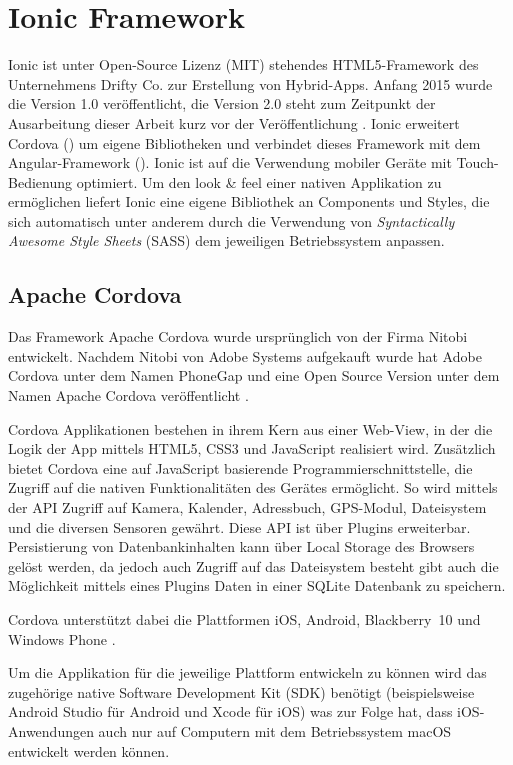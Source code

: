 \chapter{Ionic Framework}
\label{cha:ionic}
%
Ionic ist unter Open-Source Lizenz (MIT) stehendes HTML5-Framework des Unternehmens Drifty Co. zur Erstellung von Hybrid-Apps. Anfang 2015 wurde die Version 1.0 veröffentlicht, die Version 2.0 steht zum Zeitpunkt der Ausarbeitung dieser Arbeit kurz vor der Veröffentlichung \cite{ionic2Anounce}.
Ionic erweitert Cordova () um eigene Bibliotheken und verbindet dieses Framework mit dem Angular-Framework (). Ionic ist auf die Verwendung mobiler Geräte mit Touch-Bedienung optimiert. Um den look \& feel einer nativen Applikation zu ermöglichen liefert Ionic eine eigene Bibliothek an Components und Styles, die sich automatisch unter anderem  durch die Verwendung von \emph{Syntactically Awesome Style Sheets} (SASS) dem jeweiligen Betriebssystem anpassen.
%
%
\section{Apache Cordova}
\label{sec:ApacheCordova}
%
Das Framework Apache Cordova wurde ursprünglich von der Firma Nitobi entwickelt. Nachdem Nitobi von Adobe Systems aufgekauft wurde hat Adobe Cordova unter dem Namen PhoneGap und eine Open Source Version unter dem Namen Apache Cordova veröffentlicht \cite{adobePhoneGap}.

Cordova Applikationen bestehen in ihrem Kern aus einer Web-View, in der die Logik der App mittels HTML5, CSS3 und JavaScript realisiert wird. 
Zusätzlich bietet Cordova eine auf JavaScript basierende Programmierschnittstelle, die Zugriff auf die nativen Funktionalitäten des Gerätes ermöglicht. So wird mittels der API Zugriff auf Kamera, Kalender, Adressbuch, GPS-Modul, Dateisystem und die diversen Sensoren gewährt. Diese API ist über Plugins erweiterbar. Persistierung von Datenbankinhalten kann über Local Storage des Browsers gelöst werden, da jedoch auch Zugriff auf das Dateisystem besteht gibt auch die Möglichkeit mittels eines Plugins Daten in einer SQLite Datenbank zu speichern.

Cordova unterstützt dabei die Plattformen iOS, Android, Blackberry~10 und Windows Phone \cite{cordovaSupportedPlatforms}.

Um die Applikation für die jeweilige Plattform entwickeln zu können wird das zugehörige native Software Development Kit (SDK) benötigt (beispielsweise Android Studio für Android und Xcode für iOS) was zur Folge hat, dass iOS-Anwendungen auch nur auf Computern mit dem Betriebssystem macOS entwickelt werden können.

